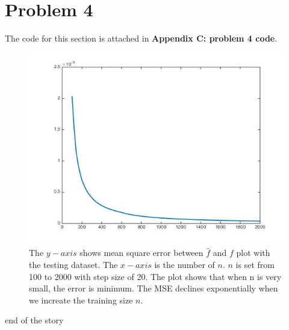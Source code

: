 \documentclass[twoside]{article}
\theoremstyle{definition}
\theoremstyle{definition}
\theoremstyle{remark}
\begin{document}
\section{Problem 4}
The code for this section is attached in \textbf{Appendix C: problem 4 code}. 
\begin{figure}[H]
\centering
\includegraphics[width=120mm]{approxErr.jpg}
\caption{ The $y-axis$ shows mean square error between $\hat f$ and $f$ plot with the testing dataset. The $x-axis$ is the number of $n$. $n$ is set from 100 to 2000 with step size of 20. The plot shows that when n is very small, the error is minimum. The MSE declines exponentially when we increate the training size $n$.  \label{problem2Pic6}}
\end{figure}


 
end of the story
\end{document}
